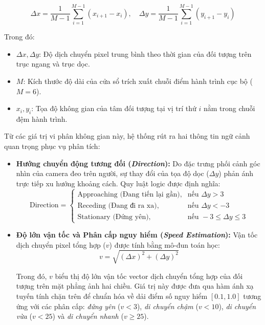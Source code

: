 \begin{equation}
    \Delta x = \frac{1}{M-1} \sum_{i=1}^{M-1} \left( x_{i+1} - x_i \right), \quad \Delta y = \frac{1}{M-1} \sum_{i=1}^{M-1} \left( y_{i+1} - y_i \right)
\end{equation}

Trong đó:
\begin{itemize}
    \item $\Delta x, \Delta y$: Độ dịch chuyển pixel trung bình theo thời gian của đối tượng trên trục ngang và trục dọc.
    \item $M$: Kích thước độ dài của cửa sổ trích xuất chuỗi điểm hành trình cục bộ ($M = 6$).
    \item $x_i, y_i$: Tọa độ không gian của tâm đối tượng tại vị trí thứ $i$ nằm trong chuỗi đệm hành trình.
\end{itemize}

Từ các giá trị vi phân không gian này, hệ thống rút ra hai thông tin ngữ cảnh quan trọng phục vụ phân tích:

\begin{itemize}
    \item[\textbf{a)}] \textbf{Hướng chuyển động tương đối (\textit{Direction}):} Do đặc trưng phối cảnh góc nhìn của camera đeo trên người, sự thay đổi của tọa độ dọc ($\Delta y$) phản ánh trực tiếp xu hướng khoảng cách. Quy luật logic được định nghĩa:
    \begin{equation}
        \text{Direction} = \begin{cases} 
            \text{Approaching (Đang tiến lại gần)}, & \text{nếu } \Delta y > 3 \\
            \text{Receding (Đang đi ra xa)}, & \text{nếu } \Delta y < -3 \\
            \text{Stationary (Đứng yên)}, & \text{nếu } -3 \le \Delta y \le 3 
        \end{cases}
    \end{equation}
    
    \item[\textbf{b)}] \textbf{Độ lớn vận tốc và Phân cấp nguy hiểm (\textit{Speed Estimation}):} Vận tốc dịch chuyển pixel tổng hợp ($v$) được tính bằng mô-đun toán học:
    \begin{equation}
        v = \sqrt{(\Delta x)^2 + (\Delta y)^2}
    \end{equation}
    
    Trong đó, $v$ biểu thị độ lớn vận tốc vector dịch chuyển tổng hợp của đối tượng trên mặt phẳng ảnh hai chiều. Giá trị này được đưa qua hàm ánh xạ tuyến tính chặn trên để chuẩn hóa về dải điểm số nguy hiểm $[0.1, 1.0]$ tương ứng với các phân cấp: \textit{đứng yên} ($v < 3$), \textit{di chuyển chậm} ($v < 10$), \textit{di chuyển vừa} ($v < 25$) và \textit{di chuyển nhanh} ($v \ge 25$).
\end{itemize}

